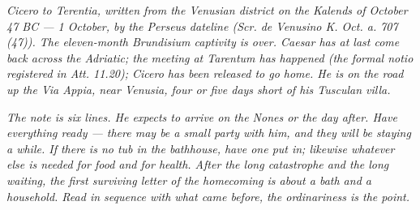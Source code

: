 
\textit{Cicero to Terentia, written from the Venusian
district on the Kalends of October 47 BC --- 1 October,
by the Perseus dateline (\textit{Scr. de Venusino K. Oct.
a. 707 (47)}). The eleven-month Brundisium captivity is
over. Caesar has at last come back across the Adriatic;
the meeting at Tarentum has happened (the formal
\textit{notio} registered in \textit{Att.} 11.20);
Cicero has been released to go home. He is on the road
up the Via Appia, near Venusia, four or five days short
of his Tusculan villa.}

\textit{The note is six lines. He expects to arrive on
the Nones or the day after. Have everything ready ---
there may be a small party with him, and they will be
staying a while. If there is no tub in the bathhouse,
have one put in; likewise whatever else is needed for
food and for health. After the long catastrophe and
the long waiting, the first surviving letter of the
homecoming is about a bath and a household. Read in
sequence with what came before, the ordinariness is
the point.}
